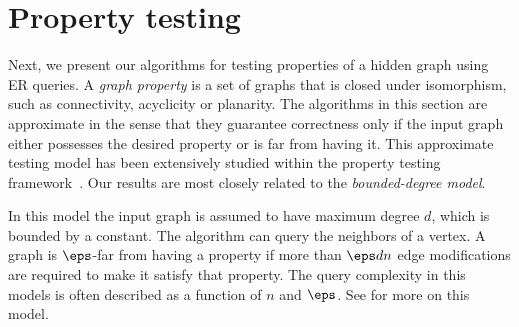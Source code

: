 \section{Property testing}
Next, we present our algorithms for testing properties of a hidden graph using ER queries. A \emph{graph property} is a set of graphs that is closed under isomorphism, such as connectivity, acyclicity or planarity. The algorithms in this section are approximate in the sense that they guarantee correctness only if the input graph either possesses the desired property or is far from having it. This approximate testing model has been extensively studied within the property testing framework~\cite{books/cu/Goldreich17}. Our results are most closely related to the \emph{bounded-degree model}.

In this model the input graph is assumed to have maximum degree $d$, which is bounded by a constant.  The algorithm can query the neighbors of a vertex.  A graph is $\eps$-far from having a property if more than $\eps d n$ edge modifications are required to make it satisfy that property.  The query complexity in this models is often described as a function of $n$ and $\eps$. See \citet[Section 9]{books/cu/Goldreich17} for more on this model.


